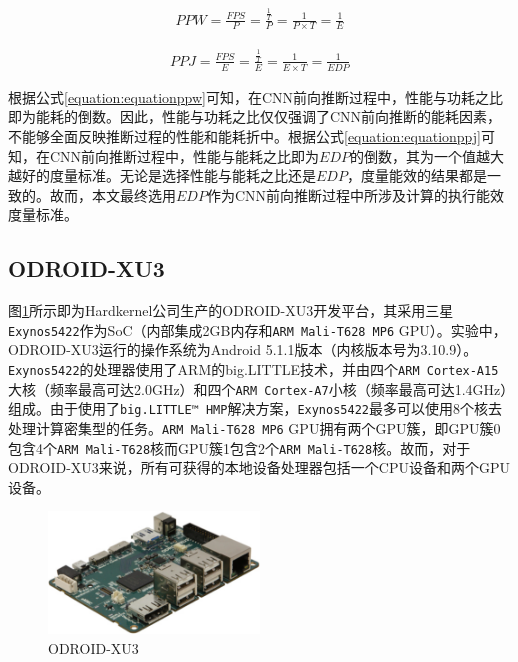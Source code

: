 \begin{equation}
     \label{equation:equationppw}
     \begin{aligned}
        PPW = \frac{FPS}{P}
        = \frac{\frac{1}{T}}{P}
        = \frac{1}{P \times T}
        = \frac{1}{E}
     \end{aligned}
\end{equation}

\begin{equation}
     \label{equation:equationppj}
     \begin{aligned}
        PPJ = \frac{FPS}{E}
        = \frac{\frac{1}{T}}{E}
        = \frac{1}{E \times T}
        = \frac{1}{EDP}
     \end{aligned}
\end{equation}

根据公式\ref{equation:equationppw}可知，在CNN前向推断过程中，性能与功耗之比即为能耗的倒数。因此，性能与功耗之比仅仅强调了CNN前向推断的能耗因素，不能够全面反映推断过程的性能和能耗折中。根据公式\ref{equation:equationppj}可知，在CNN前向推断过程中，性能与能耗之比即为$EDP$的倒数，其为一个值越大越好的度量标准。无论是选择性能与能耗之比还是$EDP$，度量能效的结果都是一致的。故而，本文最终选用$EDP$作为CNN前向推断过程中所涉及计算的执行能效度量标准。

\subsection{ODROID-XU3}
\label{chapter:chapter2-5-1}
图\ref{figure:figureodroid}所示即为Hardkernel公司生产的ODROID-XU3开发平台，其采用三星\texttt{Exynos5422}作为SoC（内部集成2GB内存和\texttt{ARM Mali-T628 MP6} GPU）。实验中，ODROID-XU3运行的操作系统为Android 5.1.1版本（内核版本号为3.10.9）。\texttt{Exynos5422}的处理器使用了ARM的big.LITTLE技术，并由四个\texttt{ARM Cortex-A15}大核（频率最高可达2.0GHz）和四个\texttt{ARM Cortex-A7}小核（频率最高可达1.4GHz）组成。由于使用了\texttt{big.LITTLE™ HMP}解决方案，\texttt{Exynos5422}最多可以使用8个核去处理计算密集型的任务。\texttt{ARM Mali-T628 MP6} GPU拥有两个GPU簇，即GPU簇0包含4个\texttt{ARM Mali-T628}核而GPU簇1包含2个\texttt{ARM Mali-T628}核\cite{lokhmotov2015gemmbench}。故而，对于ODROID-XU3来说，所有可获得的本地设备处理器包括一个CPU设备和两个GPU设备\label{chapter:chapter1-1}。

\begin{figure}[htbp]
    \begin{center}
    \includegraphics[width=0.5\textwidth]{figures/odroid.pdf}
    \end{center}
    \caption{ODROID-XU3}\label{figure:figureodroid}
\end{figure}

